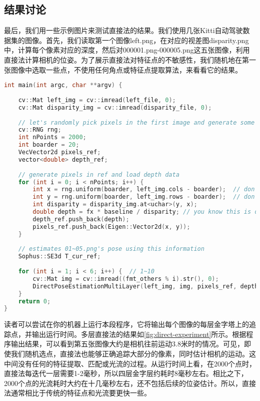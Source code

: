 \subsection{结果讨论}
最后，我们用一些示例图片来测试直接法的结果。我们使用几张Kitti\textsubscript{\cite{Geiger2013}}自动驾驶数据集的图像。首先，我们读取第一个图像left.png，在对应的视差图disparity.png中，计算每个像素对应的深度，然后对000001.png-000005.png这五张图像，利用直接法计算相机的位姿。为了展示直接法对特征点的不敏感性，我们随机地在第一张图像中选取一些点，不使用任何角点或特征点提取算法，来看看它的结果。
\begin{lstlisting}[language=c++,caption=slambook2/ch8/direct_method.cpp（片段）]
int main(int argc, char **argv) {
	
	cv::Mat left_img = cv::imread(left_file, 0);
	cv::Mat disparity_img = cv::imread(disparity_file, 0);
	
	// let's randomly pick pixels in the first image and generate some 3d points in the first image's frame
	cv::RNG rng;
	int nPoints = 2000;
	int boarder = 20;
	VecVector2d pixels_ref;
	vector<double> depth_ref;
	
	// generate pixels in ref and load depth data
	for (int i = 0; i < nPoints; i++) {
		int x = rng.uniform(boarder, left_img.cols - boarder);  // don't pick pixels close to boarder
		int y = rng.uniform(boarder, left_img.rows - boarder);  // don't pick pixels close to boarder
		int disparity = disparity_img.at<uchar>(y, x);
		double depth = fx * baseline / disparity; // you know this is disparity to depth
		depth_ref.push_back(depth);
		pixels_ref.push_back(Eigen::Vector2d(x, y));
	}
	
	// estimates 01~05.png's pose using this information
	Sophus::SE3d T_cur_ref;
	
	for (int i = 1; i < 6; i++) {  // 1~10
		cv::Mat img = cv::imread((fmt_others % i).str(), 0);
		DirectPoseEstimationMultiLayer(left_img, img, pixels_ref, depth_ref, T_cur_ref);
	}
	return 0;
}
\end{lstlisting}

读者可以尝试在你的机器上运行本段程序，它将输出每个图像的每层金字塔上的追踪点，并输出运行时间。多层直接法的结果如\autoref{fig:direct-experiment}所示。根据程序输出结果，可以看到第五张图像大约是相机往前运动3.8米时的情况。可见，即使我们随机选点，直接法也能够正确追踪大部分的像素，同时估计相机的运动。这中间没有任何的特征提取、匹配或光流的过程。从运行时间上看，在2000个点时，直接法每迭代一层需要1-2毫秒，所以四层金字层约耗时8毫秒左右。相比之下，2000个点的光流耗时大约在十几毫秒左右，还不包括后续的位姿估计。所以，直接法通常相比于传统的特征点和光流要更快一些。

